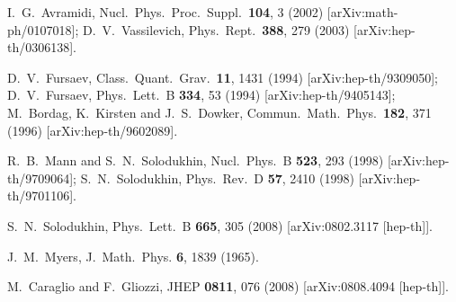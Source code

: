 \documentclass[a4paper]{article}
\begin{document}
\begin{thebibliography}{99}



  I.~G.~Avramidi,
  Nucl.\ Phys.\ Proc.\ Suppl.\  {\bf 104}, 3 (2002)
  [arXiv:math-ph/0107018];
  D.~V.~Vassilevich,
  Phys.\ Rept.\  {\bf 388}, 279 (2003)
  [arXiv:hep-th/0306138].



  D.~V.~Fursaev,
  Class.\ Quant.\ Grav.\  {\bf 11}, 1431 (1994)
  [arXiv:hep-th/9309050];
  D.~V.~Fursaev,
  Phys.\ Lett.\  B {\bf 334}, 53 (1994)
  [arXiv:hep-th/9405143];
  M.~Bordag, K.~Kirsten and J.~S.~Dowker,
  Commun.\ Math.\ Phys.\  {\bf 182}, 371 (1996)
  [arXiv:hep-th/9602089].
  
  R.~B.~Mann and S.~N.~Solodukhin,
  Nucl.\ Phys.\  B {\bf 523}, 293 (1998)
  [arXiv:hep-th/9709064];
  S.~N.~Solodukhin,
  Phys.\ Rev.\  D {\bf 57}, 2410 (1998)
  [arXiv:hep-th/9701106].

  S.~N.~Solodukhin,
  Phys.\ Lett.\  B {\bf 665}, 305 (2008)
  [arXiv:0802.3117 [hep-th]].
  
J.~M.~Myers, J.\ Math.\ Phys. {\bf 6}, 1839 (1965).

  
  M.~Caraglio and F.~Gliozzi,
  JHEP {\bf 0811}, 076 (2008)
  [arXiv:0808.4094 [hep-th]].




 

\end{thebibliography}
\end{document}
